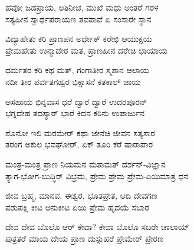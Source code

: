 \begin{myquote}
ಹವೋ ಜಡಪ್ರಾಯ, ಅತಿನೀಚ, ಮುಖೆ ಮಧು ಅಂತರೆ ಗರಳ\\ಸತ್ಯಹೀನ ಸ್ವಾರ್ಥಪರಾಯಣ ತವಪಾವೆ ಏ ಸಂಸಾರೇ ಸ್ಥಾನ
\end{myquote}


\begin{myquote}
ವಿದ್ಯಾಹೇತು ಕರಿ ಪ್ರಾಣಪನ ಅರ್ಧೇಕ್ ಕರೇಛಿ ಆಯುಕ್ಷಯ\\ಪ್ರೇಮಹೇತು ಉನ್ಮಾದೇರ ಮತ, ಪ್ರಾಣಹೀನ ದರೇಚಿ ಛಾಯಾಯ
\end{myquote}


\begin{myquote}
ಧರ್ಮತರ ಕರಿ ಕಥ ಮತ್, ಗಂಗಾತೀರ ಸ್ಮಶಾನ ಆಲಾಯ\\ನದೀ ತೀರ ಪರ್ವತಗಹ್ವರ ಭಿಕ್ಷಾಸನೆ ಕತಕಾಲ್ ಜಾಯ
\end{myquote}


\begin{myquote}
ಅಸಹಾಯ ಭಿನ್ನವಾಸ ಧರೆ ದ್ವಾರೆ ದ್ವಾರೆ ಉದರಪೂರನ್\\ಭಗ್ನದೇಹ ತದಸ್ಯಾರ್‌ ಭಾರೆ ಕಿದನ ಕರಿನು ಉಪಾರ್ಜುನ
\end{myquote}


\begin{myquote}
ಶೊನೋ ಇಲಿ ಮರಮೇರ್ ಕಥಾ ಜೇನೆಚಿ ಜೀವನ ಸತ್ಯಸಾರ\\ತರಂಗ ಅಕುಲ ಭವಘೋರ್, ಏಕ್ ತೂರಿ ಕರೆ ಷಾರಾಪಾರ
\end{myquote}


\begin{myquote}
ಮಂತ್ರ-ಮಂತ್ರ ಪ್ರಾಣ ನಿಯಮನ ಮತಾಮತ್ ದರ್ಶನ್-ವಿಜ್ಞಾನ\\ತ್ಯಾಗ-ಭೋಗ-ಬುದ್ಧಿ‌ರ್ ವಿಭ್ರಮ, ಪ್ರೇಮ ಪ್ರೇಮ ಪ್ರೇಮ-ಏಯಿಮಾತ್ರ ಧನ
\end{myquote}


\begin{myquote}
ಜೀವ ಬ್ರಹ್ಮ, ಮಾನವ, ಈಶ್ವರ, ಭೂತಪ್ರೇತ, ಆದಿ ದೇವಗಣ\\ಪಶುಪಕ್ಷಿ ಕೀಟ ಅನುಕೀಟ ಏಯಿ ಪ್ರೇಮ ಹೃದಯೆ ಸಬಾರ
\end{myquote}


\begin{myquote}
ದೇವ ದೇವ ಬೊಲೊ ಆರ್ ಕೇವಾ? ಕೇವಾ ಬೊಲೊ ಸಬರೇ ಚಾಲಾಯ್\\ಪುತ್ರತರೆ ಮಾಯ ದೇಯ ಪ್ರಾಣ ದುಸ್ಸುಹರೆ ಪ್ರೇಮೇರ್‌ ಪ್ರೇರಣ
\end{myquote}

